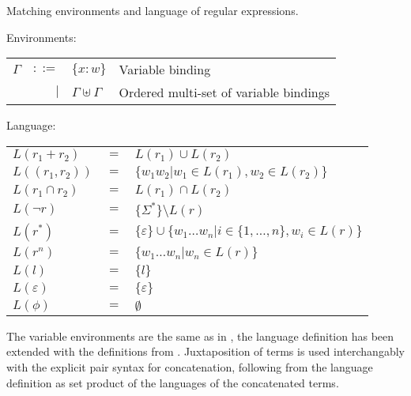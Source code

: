 \begin{defn}
   \label{defn-lang}
   Matching environments and language of regular expressions.

   Environments:

   \begin{tabular}{lrll}
      $\Gamma$	& $::=$	& $\{x:w\}$			& Variable binding	\\
		& $|$	& $\Gamma \uplus \Gamma$	& Ordered multi-set of
							  variable bindings	\\
   \end{tabular}

   Language:

   \begin{tabular}{lll}
      $L(r_1 + r_2)$	& $=$	& $L(r_1) \cup L(r_2)$					\\
      $L((r_1, r_2))$	& $=$	& $\{ w_1w_2 | w_1 \in L(r_1), w_2 \in L(r_2) \}$	\\
      $L(r_1 \cap r_2)$	& $=$	& $L(r_1) \cap L(r_2)$					\\
      $L(\neg r)$	& $=$	& $\{\Sigma^*\} \setminus L(r)$				\\
      $L(r^*)$		& $=$	&
         $\{\varepsilon\} \cup \{ w_1 \dots w_n | i
         \in \{ 1, \dots, n \}, w_i \in L(r) \}$	\\
      $L(r^n)$		& $=$	&
         $\{ w_1 \dots w_n | w_n \in L(r) \}$	\\
      $L(l)$		& $=$	& $\{l\}$						\\
      $L(\varepsilon)$	& $=$	& $\{\varepsilon\}$					\\
      $L(\phi)$		& $=$	& $\emptyset$						\\
   \end{tabular}
\end{defn}


The variable environments are the same as in \cite{pd-pat}, the language
definition has been extended with the definitions from \cite{pd-ere}.
Juxtaposition of terms is used interchangably with the explicit pair syntax
for concatenation, following from the language definition as set product of
the languages of the concatenated terms.


